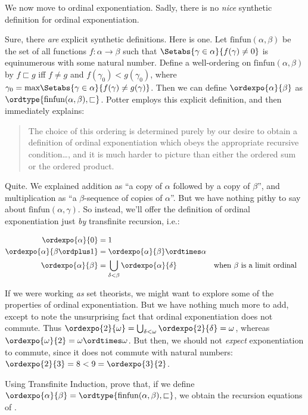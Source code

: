 \documentclass[../../../include/open-logic-section]{subfiles}
\begin{document}

We now move to ordinal exponentiation. Sadly, there is no \emph{nice}
synthetic definition for ordinal exponentiation.

Sure, there \emph{are} explicit synthetic definitions. Here is one.
Let $\text{finfun}(\alpha,\beta)$ be the set of all functions $f
\colon \alpha \to \beta$ such that $\Setabs{\gamma \in
\alpha}{f(\gamma) \neq 0}$ is equinumerous with some natural number.
Define a well-ordering on $\text{finfun}(\alpha,\beta)$ by $f
\sqsubset g$ iff $f \neq g$ and $f(\gamma_0) < g(\gamma_0)$, where
$\gamma_0 = \text{max}\Setabs{\gamma \in \alpha}{f(\gamma) \neq
g(\gamma)}$. Then we can define $\ordexpo{\alpha}{\beta}$ as
$\ordtype{\text{finfun}(\alpha, \beta), \sqsubset}$. Potter employs
this explicit definition, and then immediately explains:
\begin{quote}
	The choice of this ordering is determined purely by our desire to
	obtain a definition of ordinal exponentiation which obeys the
	appropriate recursive condition\ldots, and it is much harder to
	picture than either the ordered sum or the ordered product.
	\cite[p.~199]{Potter2004}
\end{quote}
Quite. We explained addition as ``a copy of $\alpha$ followed by a
copy of $\beta$'', and multiplication as ``a $\beta$-sequence of
copies of $\alpha$''. But we have nothing pithy to say about
$\text{finfun}(\alpha, \gamma)$. So instead, we'll offer the
definition of ordinal exponentiation just \emph{by} transfinite
recursion, i.e.:

\begin{defn}
\begin{align*}
	\ordexpo{\alpha}{0} &= 1\\
	\ordexpo{\alpha}{\beta\ordplus 1} &=\ordexpo{\alpha}{\beta} \ordtimes \alpha\\
	\ordexpo{\alpha}{\beta} &= \bigcup_{\delta < \beta}\ordexpo{\alpha}{\delta}& & \text{when $\beta$ is a limit ordinal}
\end{align*}
\end{defn}

If we were working \emph{as} set theorists, we might want to explore
some of the properties of ordinal exponentiation. But we have nothing
much more to add, except to note the unsurprising fact that ordinal
exponentiation does not commute. Thus $\ordexpo{2}{\omega} =
\bigcup_{\delta < \omega}\ordexpo{2}{\delta} = \omega$, whereas
$\ordexpo{\omega}{2} = \omega \ordtimes \omega$. But then, we should
not \emph{expect} exponentiation to commute, since it does not commute
with natural numbers: $\ordexpo{2}{3} = 8 < 9 = \ordexpo{3}{2}$. 

\begin{prob}
Using Transfinite Induction, prove that, if we define
$\ordexpo{\alpha}{\beta} = \ordtype{\text{finfun}(\alpha, \beta),
\sqsubset}$, we obtain the recursion equations of
.
\end{prob}
\end{document}
